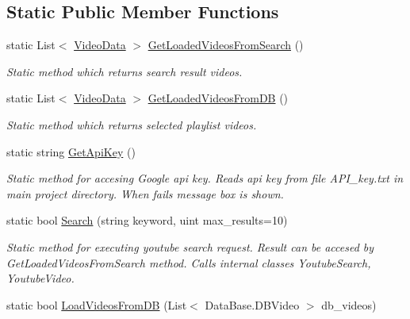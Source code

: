 \subsection*{Static Public Member Functions}
\begin{DoxyCompactItemize}
\item 
static List$<$ \mbox{\hyperlink{struct_you_tube_tracker_1_1_video_data}{Video\+Data}} $>$ \mbox{\hyperlink{class_you_tube_tracker_1_1_youtube_tracker_a051294db3492eddceab4772c431cc5bc}{Get\+Loaded\+Videos\+From\+Search}} ()
\begin{DoxyCompactList}\small\item\em Static method which returns search result videos. \end{DoxyCompactList}\item 
static List$<$ \mbox{\hyperlink{struct_you_tube_tracker_1_1_video_data}{Video\+Data}} $>$ \mbox{\hyperlink{class_you_tube_tracker_1_1_youtube_tracker_a6a194051a9ab5add4c090da7392a8c9d}{Get\+Loaded\+Videos\+From\+DB}} ()
\begin{DoxyCompactList}\small\item\em Static method which returns selected playlist videos. \end{DoxyCompactList}\item 
static string \mbox{\hyperlink{class_you_tube_tracker_1_1_youtube_tracker_a8e33afb1adb2d2a4a0b1d539f2631827}{Get\+Api\+Key}} ()
\begin{DoxyCompactList}\small\item\em Static method for accesing Google api key. Reads api key from file {\ttfamily A\+P\+I\+\_\+key.\+txt} in main project directory. When fails message box is shown. \end{DoxyCompactList}\item 
static bool \mbox{\hyperlink{class_you_tube_tracker_1_1_youtube_tracker_a24b98848290566830b3f08b09168f4d9}{Search}} (string keyword, uint max\+\_\+results=10)
\begin{DoxyCompactList}\small\item\em Static method for executing youtube search request. Result can be accesed by {\ttfamily Get\+Loaded\+Videos\+From\+Search} method. Calls internal classes {\ttfamily Youtube\+Search}, {\ttfamily Youtube\+Video}. \end{DoxyCompactList}\item 
static bool \mbox{\hyperlink{class_you_tube_tracker_1_1_youtube_tracker_af040757c1f7db9fd8f81cf06e4ade32f}{Load\+Videos\+From\+DB}} (List$<$ Data\+Base.\+D\+B\+Video $>$ db\+\_\+videos)

\end{DoxyCompactItemize}
